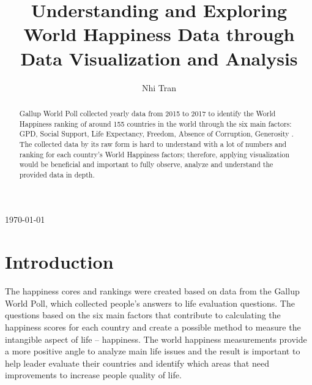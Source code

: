 \documentclass[11pt,twocolumn]{article}
\begin{document}
\begin{titlepage}
    
    
    \vfill\vfill\vfill %
    
    {\large\today} %
    
    
     
    
    \vfill %
    
\end{titlepage}

\title{Understanding and Exploring World Happiness Data through Data Visualization and Analysis}
\author{Nhi Tran}
\maketitle
\begin{abstract}
Gallup World Poll collected yearly data from 2015 to 2017 to identify the World Happiness ranking of around 155 countries in the world through the six main factors: GPD, Social Support, Life Expectancy, Freedom, Absence of Corruption, Generosity \cite{kaggle-dataset}. The collected data by its raw form is hard to understand with a lot of numbers and ranking for each country's World Happiness factors; therefore, applying visualization would be beneficial and important to fully observe, analyze and understand the provided data in depth.
\end{abstract}

\section{Introduction}
The happiness cores and rankings were created based on data from the Gallup World Poll, which collected people's answers to life evaluation questions. The questions based on the six main factors that contribute to calculating the happiness scores for each country and create a possible method to measure the intangible aspect of life – happiness. The world happiness measurements provide a more positive angle to analyze main life issues and the result is important to help leader evaluate their countries and identify which areas that need improvements to increase people quality of life. 
\end{document}
